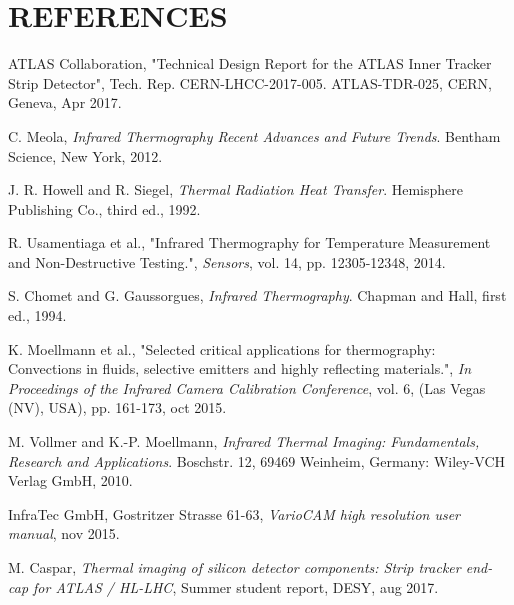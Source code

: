 \pagestyle{references}

\section*{\uppercase{References}}\label{referen}
	\bigskip
	\bigskip
	\begin{enumerate}[label={[\arabic*]}]
	
		\item ATLAS Collaboration, "Technical Design Report for the ATLAS Inner Tracker Strip Detector", Tech. Rep. CERN-LHCC-2017-005. ATLAS-TDR-025, CERN, Geneva, Apr 2017.\label{ref1}
		
		\item C. Meola,	\textit{Infrared Thermography Recent Advances and Future Trends}. Bentham Science, New York, 2012.\label{ref2}
		
		\item J. R. Howell and R. Siegel, \textit{Thermal Radiation Heat Transfer}. Hemisphere Publishing Co., third ed., 1992.\label{ref3}
		
		\item R. Usamentiaga et al., "Infrared Thermography for Temperature Measurement and Non-Destructive Testing.", \textit{Sensors}, vol. 14, pp. 12305-12348, 2014.\label{ref4}
		 
		\item S. Chomet and G. Gaussorgues, \textit{Infrared Thermography}. Chapman and Hall, first ed., 1994.\label{ref5}
		
		\item K. Moellmann et al., "Selected critical applications for thermography: Convections in fluids, selective emitters and highly reflecting materials.", \textit{In Proceedings of the Infrared Camera Calibration Conference}, vol. 6, (Las Vegas (NV), USA), pp. 161-173, oct 2015.\label{ref6}
		
		\item M. Vollmer and K.-P. Moellmann,	\textit{Infrared Thermal Imaging: Fundamentals, Research and Applications}. Boschstr. 12, 69469 Weinheim, Germany: Wiley-VCH Verlag GmbH, 2010.\label{ref7}
		
		\item InfraTec GmbH, Gostritzer Strasse 61-63, \textit{VarioCAM \textregistered\space high resolution user manual}, nov 2015.\label{ref8}
		
		\item M. Caspar, \textit{Thermal imaging of silicon detector components: Strip tracker end-cap for	ATLAS / HL-LHC}, Summer student report, DESY, aug 2017.\label{ref9}
		

\end{enumerate}
